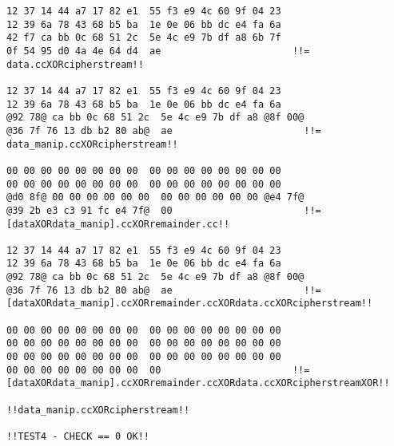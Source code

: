 \begin{lstlisting}[caption={Die Kommandozeilenausgabe von \texttt{setup\_manip\_test} aus osmoMITM}, boxpos=c, frame=single, language=bytetxt, numbers=none, basicstyle=\tiny\ttfamily, tabsize=1 ]
12 37 14 44 a7 17 82 e1  55 f3 e9 4c 60 9f 04 23 
12 39 6a 78 43 68 b5 ba  1e 0e 06 bb dc e4 fa 6a 
42 f7 ca bb 0c 68 51 2c  5e 4c e9 7b df a8 6b 7f 
0f 54 95 d0 4a 4e 64 d4  ae                       !!= data.ccXORcipherstream!!

12 37 14 44 a7 17 82 e1  55 f3 e9 4c 60 9f 04 23 
12 39 6a 78 43 68 b5 ba  1e 0e 06 bb dc e4 fa 6a 
@92 78@ ca bb 0c 68 51 2c  5e 4c e9 7b df a8 @8f 00@ 
@36 7f 76 13 db b2 80 ab@  ae                       !!= data_manip.ccXORcipherstream!!

00 00 00 00 00 00 00 00  00 00 00 00 00 00 00 00 
00 00 00 00 00 00 00 00  00 00 00 00 00 00 00 00 
@d0 8f@ 00 00 00 00 00 00  00 00 00 00 00 00 @e4 7f@ 
@39 2b e3 c3 91 fc e4 7f@  00                       !!= [dataXORdata_manip].ccXORremainder.cc!!

12 37 14 44 a7 17 82 e1  55 f3 e9 4c 60 9f 04 23 
12 39 6a 78 43 68 b5 ba  1e 0e 06 bb dc e4 fa 6a 
@92 78@ ca bb 0c 68 51 2c  5e 4c e9 7b df a8 @8f 00@ 
@36 7f 76 13 db b2 80 ab@  ae                       !!= [dataXORdata_manip].ccXORremainder.ccXORdata.ccXORcipherstream!!

00 00 00 00 00 00 00 00  00 00 00 00 00 00 00 00 
00 00 00 00 00 00 00 00  00 00 00 00 00 00 00 00 
00 00 00 00 00 00 00 00  00 00 00 00 00 00 00 00 
00 00 00 00 00 00 00 00  00                       !!= [dataXORdata_manip].ccXORremainder.ccXORdata.ccXORcipherstreamXOR!!
                                                    !!data_manip.ccXORcipherstream!!

!!TEST4 - CHECK == 0 OK!!
\end{lstlisting}